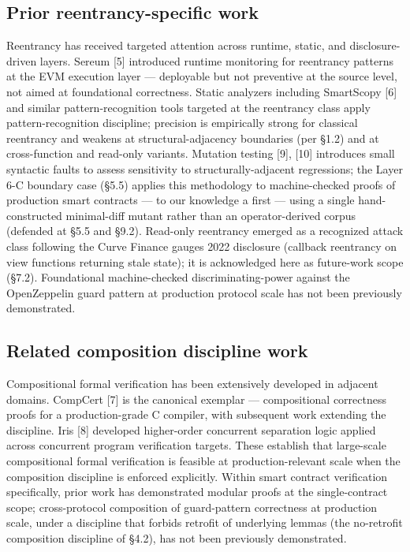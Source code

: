 \subsection{Prior reentrancy-specific
work}\label{prior-reentrancy-specific-work}

Reentrancy has received targeted attention across runtime, static, and
disclosure-driven layers. Sereum {[}5{]} introduced runtime monitoring
for reentrancy patterns at the EVM execution layer --- deployable but
not preventive at the source level, not aimed at foundational
correctness. Static analyzers including SmartScopy {[}6{]} and similar
pattern-recognition tools targeted at the reentrancy class apply
pattern-recognition discipline; precision is empirically strong for
classical reentrancy and weakens at structural-adjacency boundaries (per
§1.2) and at cross-function and read-only variants. Mutation testing
{[}9{]}, {[}10{]} introduces small syntactic faults to assess
sensitivity to structurally-adjacent regressions; the Layer 6-C boundary
case (§5.5) applies this methodology to machine-checked proofs of
production smart contracts --- to our knowledge a first --- using a
single hand-constructed minimal-diff mutant rather than an
operator-derived corpus (defended at §5.5 and §9.2). Read-only
reentrancy emerged as a recognized attack class following the Curve
Finance gauges 2022 disclosure (callback reentrancy on view functions
returning stale state); it is acknowledged here as future-work scope
(§7.2). Foundational machine-checked discriminating-power against the
OpenZeppelin guard pattern at production protocol scale has not been
previously demonstrated.

\subsection{Related composition discipline
work}\label{related-composition-discipline-work}

Compositional formal verification has been extensively developed in
adjacent domains. CompCert {[}7{]} is the canonical exemplar ---
compositional correctness proofs for a production-grade C compiler, with
subsequent work extending the discipline. Iris {[}8{]} developed
higher-order concurrent separation logic applied across concurrent
program verification targets. These establish that large-scale
compositional formal verification is feasible at production-relevant
scale when the composition discipline is enforced explicitly. Within
smart contract verification specifically, prior work has demonstrated
modular proofs at the single-contract scope; cross-protocol composition
of guard-pattern correctness at production scale, under a discipline
that forbids retrofit of underlying lemmas (the no-retrofit composition
discipline of §4.2), has not been previously demonstrated.

